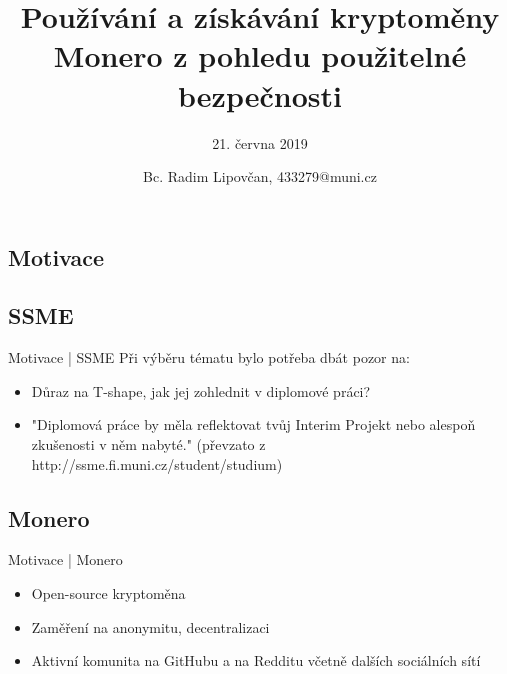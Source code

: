 \documentclass{beamer}
\title{Používání a získávání kryptoměny Monero z pohledu použitelné bezpečnosti} %
\subtitle{21. června 2019} %
\author{Bc. Radim Lipovčan, 433279@muni.cz}
\begin{document}
  \frame{\maketitle}


  \begin{darkframes}
    \section{Motivace}
    \subsection{SSME}
    \begin{frame}{Motivace | SSME}
    Při výběru tématu bylo potřeba dbát pozor na:
		\begin{itemize}
		\item Důraz na T-shape, jak jej zohlednit v diplomové práci?
		\item "Diplomová práce by měla reflektovat tvůj Interim Projekt nebo alespoň zkušenosti v něm nabyté." (převzato z http://ssme.fi.muni.cz/student/studium)
		\end{itemize}		     
     
    \end{frame}
    \subsection{Monero}
    \begin{frame}{Motivace | Monero}
		\begin{itemize}
		\item Open-source kryptoměna
    	\item Zaměření na anonymitu, decentralizaci
     	\item Aktivní komunita na GitHubu a na Redditu včetně dalších sociálních sítí
		\end{itemize}  
		  
    \end{frame}

\end{darkframes}
\end{document}
